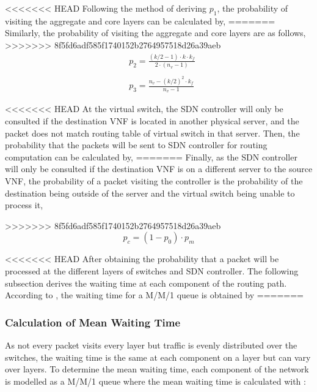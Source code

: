 <<<<<<< HEAD
Following the method of deriving $p_1$, the probability of visiting the aggregate and core layers can be calculated by,
=======
Similarly, the probability of visiting the aggregate and core layers are as follows,
>>>>>>> 8f5fd6adf585f1740152b2764957518d26a39aeb
\begin{align}
\label{eq:p_agg_core}
&p_{ 2 }=\frac { (k/2-1)\cdot k\cdot k_{ f } }{ 2\cdot (n_{ v }-1) } \\ \nonumber \\
&p_{3} = \frac{n_v - (k/2)^2 \cdot k_{f}}{n_v - 1}
\end{align}

<<<<<<< HEAD
At the virtual switch, the SDN controller will only be consulted if the destination VNF is located in another physical server, and the packet does not match routing table of virtual switch in that server. Then, the probability that the packets will be sent to SDN controller for routing computation can be calculated by, 
=======
Finally, as the SDN controller will only be consulted if the destination VNF is on a different server to the source VNF, the probability of a packet visiting the controller is the probability of the destination being outside of the server and the virtual switch being unable to process it,

>>>>>>> 8f5fd6adf585f1740152b2764957518d26a39aeb
\begin{equation}
\label{eq:p_sdn}
p_{c} = (1 - p_{0}) \cdot p_{m}
\end{equation}

<<<<<<< HEAD
After obtaining the probability that a packet will be processed at the different layers of switches and SDN controller. The following subsection derives the waiting time at each component of the routing path. According to \cite{Kleinrock75}, the waiting time for a M/M/1 queue is obtained by 
=======
\subsubsection{Calculation of Mean Waiting Time}
As not every packet visits every layer but traffic is evenly distributed over the switches, the waiting time is the same at each component on a layer but can vary over layers. To determine the mean waiting time, each component of the network is modelled as a M/M/1 queue where the mean waiting time is calculated with \cite{Kleinrock75}:

